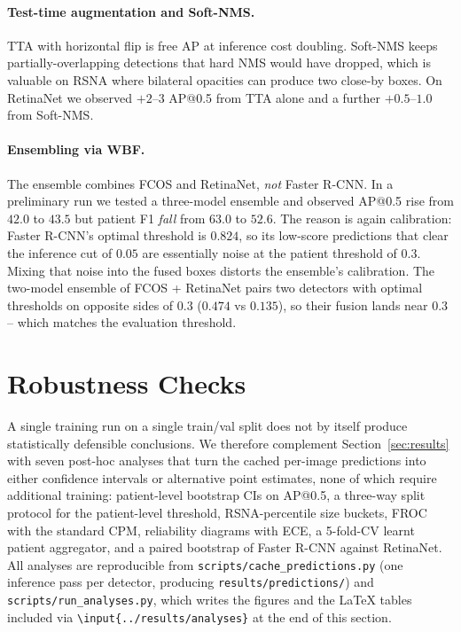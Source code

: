 \documentclass[11pt,a4paper]{article}
\begin{document}
\paragraph{Test-time augmentation and Soft-NMS.}
TTA with horizontal flip is free AP at inference cost doubling. Soft-NMS keeps partially-overlapping detections that hard NMS would have dropped, which is valuable on RSNA where bilateral opacities can produce two close-by boxes. On RetinaNet we observed $+2$--$3$ AP@0.5 from TTA alone and a further $+0.5$--$1.0$ from Soft-NMS.

\paragraph{Ensembling via WBF.}
The ensemble combines FCOS and RetinaNet, \emph{not} Faster R-CNN. In a preliminary run we tested a three-model ensemble and observed AP@0.5 rise from $42.0$ to $43.5$ but patient F1 \emph{fall} from $63.0$ to $52.6$. The reason is again calibration: Faster R-CNN's optimal threshold is $0.824$, so its low-score predictions that clear the inference cut of $0.05$ are essentially noise at the patient threshold of $0.3$. Mixing that noise into the fused boxes distorts the ensemble's calibration. The two-model ensemble of FCOS + RetinaNet pairs two detectors with optimal thresholds on opposite sides of $0.3$ ($0.474$ vs $0.135$), so their fusion lands near $0.3$ -- which matches the evaluation threshold.

\pagebreak

\section{Robustness Checks}
\label{sec:robustness}

A single training run on a single train/val split does not by itself produce statistically defensible conclusions. We therefore complement Section~\ref{sec:results} with seven post-hoc analyses that turn the cached per-image predictions into either confidence intervals or alternative point estimates, none of which require additional training: patient-level bootstrap CIs on AP@0.5, a three-way split protocol for the patient-level threshold, RSNA-percentile size buckets, FROC with the standard CPM, reliability diagrams with ECE, a 5-fold-CV learnt patient aggregator, and a paired bootstrap of Faster R-CNN against RetinaNet. All analyses are reproducible from \texttt{scripts/\allowbreak cache\_\allowbreak predictions.py} (one inference pass per detector, producing \texttt{results/\allowbreak predictions/}) and \texttt{scripts/\allowbreak run\_\allowbreak analyses.py}, which writes the figures and the LaTeX tables included via \texttt{\textbackslash{}input\{../results/analyses\}} at the end of this section.
\end{document}
